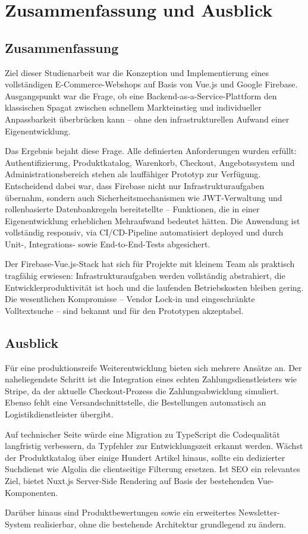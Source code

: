 \chapter{Zusammenfassung und Ausblick}
\label{ch:zusammenfassung}

\section{Zusammenfassung}
\label{sec:zusammenfassung}

Ziel dieser Studienarbeit war die Konzeption und Implementierung eines vollständigen E-Commerce-Webshops auf Basis von Vue.js und Google Firebase. Ausgangspunkt war die Frage, ob eine Backend-as-a-Service-Plattform den klassischen Spagat zwischen schnellem Markteinstieg und individueller Anpassbarkeit überbrücken kann -- ohne den infrastrukturellen Aufwand einer Eigenentwicklung.

Das Ergebnis bejaht diese Frage. Alle definierten Anforderungen wurden erfüllt: Authentifizierung, Produktkatalog, Warenkorb, Checkout, Angebotssystem und Administrationsbereich stehen als lauffähiger Prototyp zur Verfügung. Entscheidend dabei war, dass Firebase nicht nur Infrastrukturaufgaben übernahm, sondern auch Sicherheitsmechanismen wie JWT-Verwaltung und rollenbasierte Datenbankregeln bereitstellte -- Funktionen, die in einer Eigenentwicklung erheblichen Mehraufwand bedeutet hätten. Die Anwendung ist vollständig responsiv, via CI/CD-Pipeline automatisiert deployed und durch Unit-, Integrations- sowie End-to-End-Tests abgesichert.

Der Firebase-Vue.js-Stack hat sich für Projekte mit kleinem Team als praktisch tragfähig erwiesen: Infrastrukturaufgaben werden vollständig abstrahiert, die Entwicklerproduktivität ist hoch und die laufenden Betriebskosten bleiben gering. Die wesentlichen Kompromisse -- Vendor Lock-in und eingeschränkte Volltext\-suche -- sind bekannt und für den Prototypen akzeptabel.

\section{Ausblick}
\label{sec:ausblick}

Für eine produktionsreife Weiterentwicklung bieten sich mehrere Ansätze an. Der naheliegendste Schritt ist die Integration eines echten Zahlungsdienstleisters wie Stripe, da der aktuelle Checkout-Prozess die Zahlungsabwicklung simuliert. Ebenso fehlt eine Versandschnittstelle, die Bestellungen automatisch an Logistikdienstleister übergibt.

Auf technischer Seite würde eine Migration zu TypeScript die Codequalität langfristig verbessern, da Typfehler zur Entwicklungszeit erkannt werden. Wächst der Produktkatalog über einige Hundert Artikel hinaus, sollte ein dedizierter Suchdienst wie Algolia die clientseitige Filterung ersetzen. Ist SEO ein relevantes Ziel, bietet Nuxt.js Server-Side Rendering auf Basis der bestehenden Vue-Komponenten.

Darüber hinaus sind Produktbewertungen sowie ein erweitertes Newsletter-System realisierbar, ohne die bestehende Architektur grundlegend zu ändern.
